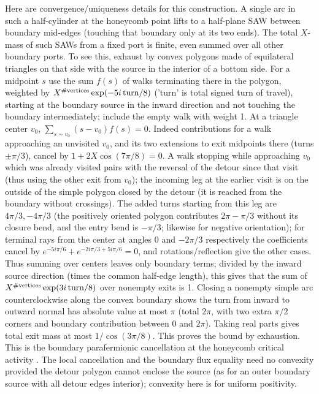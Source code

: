 \documentclass[11pt]{article}
\numberwithin{equation}{section}
\theoremstyle{definition}\newtheorem{definition}[theorem]{Definition}
\theoremstyle{remark}\newtheorem{remark}[theorem]{Remark}
\begin{document}
Here are convergence/uniqueness details for this construction. A single arc in such a half-cylinder at the honeycomb point lifts to a half-plane SAW between boundary mid-edges (touching that boundary only at its two ends). The total \(X\)-mass of such SAWs from a fixed port is finite, even summed over all other boundary ports. To see this, exhaust by convex polygons made of equilateral triangles on that side with the source in the interior of a bottom side. For a midpoint \(s\) use the sum \(f(s)\) of walks terminating there in the polygon, weighted by \(X^{\#\text{vertices}}\exp(-5i\,{\rm turn}/8)\) ('turn' is total signed turn of travel), starting at the boundary source in the inward direction and not touching the boundary intermediately; include the empty walk with weight 1. At a triangle center \(v_0\),
\(\sum_{s\sim v_0}(s-v_0)f(s)=0\).
Indeed contributions for a walk approaching an unvisited \(v_0\), and its two extensions to exit midpoints there (turns \(\pm\pi/3\)), cancel by \(1+2X\cos(7\pi/8)=0\). A walk stopping while approaching \(v_0\) which was already visited pairs with the reversal of the detour since that visit (thus using the other exit from \(v_0\)); the incoming leg at the earlier visit is on the outside of the simple polygon closed by the detour (it is reached from the boundary without crossings). The added turns starting from this leg are \(4\pi/3,-4\pi/3\) (the positively oriented polygon contributes \(2\pi-\pi/3\) without its closure bend, and the entry bend is \(-\pi/3\); likewise for negative orientation); for terminal rays from the center at angles 0 and \(-2\pi/3\) respectively the coefficients cancel by \(e^{-5i\pi/6}+e^{-2i\pi/3+5i\pi/6}=0\), and rotations/reflection give the other cases. Thus summing over centers leaves only boundary terms; divided by the inward source direction (times the common half-edge length), this gives that the sum of \(X^{\#\text{vertices}}\exp(3i\,{\rm turn}/8)\) over nonempty exits is 1. Closing a nonempty simple arc counterclockwise along the convex boundary shows the turn from inward to outward normal has absolute value at most \(\pi\) (total \(2\pi\), with two extra \(\pi/2\) corners and boundary contribution between 0 and \(2\pi\)). Taking real parts gives total exit mass at most \(1/\cos(3\pi/8)\). This proves the bound by exhaustion. This is the boundary parafermionic cancellation at the honeycomb critical activity \cite{DuminilCopinSmirnov2012}. The local cancellation and the boundary flux equality need no convexity provided the detour polygon cannot enclose the source (as for an outer boundary source with all detour edges interior); convexity here is for uniform positivity.
\end{document}
